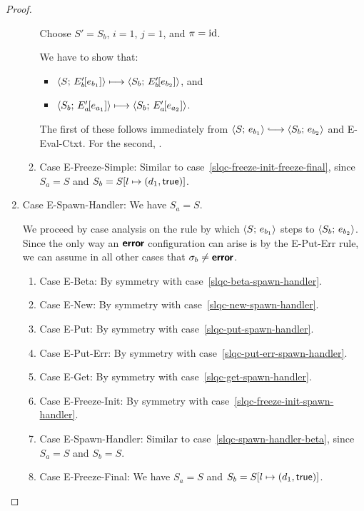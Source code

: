 \begin{proof}
\begin{enumerate}
\begin{enumerate}
      Choose $S' = S_b$, $i = 1$, $j = 1$, and $\pi = \mathrm{id}$.

      We have to show that:
      \begin{itemize}
      \item $\langle S;\, E'_b\hspace{-1mm}\left[e_{b_1}\right] \rangle \longmapsto
        \langle S_b;\, E'_b\hspace{-1mm}\left[e_{b_2}\right] \rangle$, and
      \item
        $\langle S_b;\, E'_a\hspace{-1mm}\left[e_{a_1}\right] \rangle \longmapsto
        \langle S_b;\, E'_a\hspace{-1mm}\left[e_{a_2}\right] \rangle$.
      \end{itemize}

      The first of these follows immediately from $\config{S}{e_{b_1}}
      \parstepsto \config{S_b}{e_{b_2}}$ and {\sc E-Eval-Ctxt}.  For
      the second, \TODO{}.

    \item \label{slqc-freeze-init-freeze-simple}Case {\sc
      E-Freeze-Simple}: Similar to
      case~\ref{slqc-freeze-init-freeze-final}, since $S_a = S$ and
      $S_b = S[l \mapsto (d_1, \textsf{true})]$.
    \end{enumerate}

  \item Case {\sc E-Spawn-Handler}: We have $S_a = S$.

    We proceed by case analysis on the rule by which
    $\langle S;\, e_{b_1} \rangle$ steps to $\langle S_b;\, e_{b_2} \rangle$.  Since the
    only way an $\textbf{\textsf{error}}$ configuration can arise is by the {\sc
      E-Put-Err} rule, we can assume in all other cases that $\sigma_b
    \neq \textbf{\textsf{error}}$.
    \begin{enumerate}
    \item \label{slqc-spawn-handler-beta}Case {\sc E-Beta}: By symmetry with case~\ref{slqc-beta-spawn-handler}.
    \item \label{slqc-spawn-handler-new}Case {\sc E-New}: By symmetry with case~\ref{slqc-new-spawn-handler}.
    \item \label{slqc-spawn-handler-put}Case {\sc E-Put}: By symmetry with case~\ref{slqc-put-spawn-handler}.
    \item \label{slqc-spawn-handler-put-err}Case {\sc E-Put-Err}: By symmetry with case~\ref{slqc-put-err-spawn-handler}.
    \item \label{slqc-spawn-handler-get}Case {\sc E-Get}: By symmetry with case~\ref{slqc-get-spawn-handler}.
    \item \label{slqc-spawn-handler-freeze-init}Case {\sc E-Freeze-Init}: By symmetry with case~\ref{slqc-freeze-init-spawn-handler}.
    \item \label{slqc-spawn-handler-spawn-handler}Case {\sc
      E-Spawn-Handler}: Similar to case~\ref{slqc-spawn-handler-beta},
      since $S_a = S$ and $S_b = S$.
    \item \label{slqc-spawn-handler-freeze-final}Case {\sc
      E-Freeze-Final}: We have $S_a = S$ and $S_b =
      S[l \mapsto (d_1, \textsf{true})]$.


\end{enumerate}
\end{enumerate}
\end{proof}
